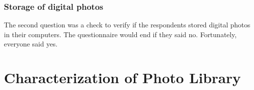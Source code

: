 




\subsubsection{Storage of digital photos} %
\label{ssub:storage_of_digital_photos}
The second question was a check to verify if the respondents stored digital photos in their computers. The questionnaire would end if they said no. Fortunately, everyone said yes.





\section{Characterization of Photo Library} %
\label{sec:characterization_of_photo_library}

